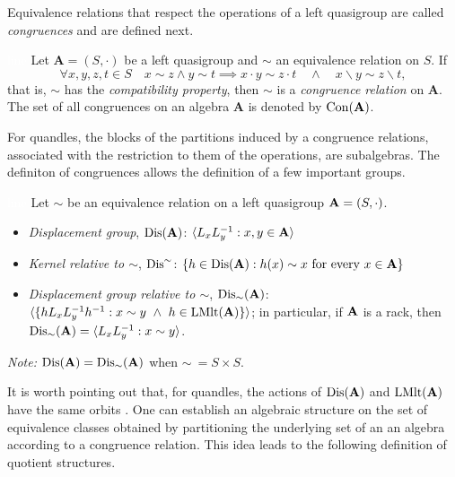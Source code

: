 \documentclass{mcom-l}
\begin{document}
\noindent Equivalence relations that respect the operations of a left quasigroup are called \emph{congruences} and are defined next.
\begin{definition} \cite{burris1981course}\textcolor{white}{line}\newline\label{congruencedef}
Let $\mathbf{A}=(S,\cdot)$ be a left quasigroup and $\sim$ an equivalence relation on $S$. If
\[\forall x,y,z,t \in S \quad x \sim z \land y \sim t \implies x \cdot y \sim z \cdot t\quad \land \quad x \backslash y \sim z \backslash t,\]
that is, $\sim$ has the \emph{compatibility property}, then $\sim$ is a \emph{congruence relation} on $\mathbf{A}$. \newline The set of all congruences on an algebra $\mathbf{A}$ is denoted by $\operatorname{Con}(\mathbf{A})$.
\end{definition}
\noindent For quandles, the blocks of the partitions induced by a congruence relations, associated with the restriction to them of the operations, are subalgebras.
\noindent The definiton of congruences allows the definition of a few important groups. 
\begin{definition} \cite{BonStanCommTheory2021}\label{defdis}\textcolor{white}{line}\newline
Let $\sim$ be an equivalence relation on a left quasigroup $\mathbf{A} = (S, \cdot)$.
\begin{itemize}
\item \textit{Displacement group}, $\operatorname{Dis}(\mathbf{A})$: $\langle L_xL_y^{-1} : x, y \in \mathbf{A}\rangle$
    \item \textit{Kernel relative to $\sim$}, $\operatorname{Dis}^{\sim}$: $\{ h \in \operatorname{Dis}(\mathbf{A}) : h(x)\sim x~\text{for every}~x \in \mathbf{A}\}$ 
    \item \textit{Displacement group relative to $\sim$},  $\operatorname{Dis}_{\sim}(\mathbf{A})$:\newline $\langle \{ hL_xL_y^{-1}h^{-1}: x\sim y~\land~ h\in \operatorname{LMlt}(\mathbf{A}) \} \rangle$; in particular, if $\mathbf{A}$ is a rack, then $\operatorname{Dis}_{\sim}(\mathbf{A}) = \langle L_xL_y^{-1}: x\sim y\rangle$.
\end{itemize}
\emph{Note:} $\operatorname{Dis}(\mathbf{A}) = \operatorname{Dis}_{\sim}(\mathbf{A})$ when $\sim~=S\times S$.
\end{definition}
\noindent It is worth pointing out that, for quandles, the actions of $\operatorname{Dis}(\mathbf{A})$ and  $\operatorname{LMlt}(\mathbf{A})$ have the same orbits \cite{BonStanCommTheory2021}.\newline\newline 
\noindent One can establish an algebraic structure on the set of equivalence classes obtained by partitioning the underlying set of an an algebra according to a congruence relation. This idea leads to the following definition of quotient structures.
\end{document}
